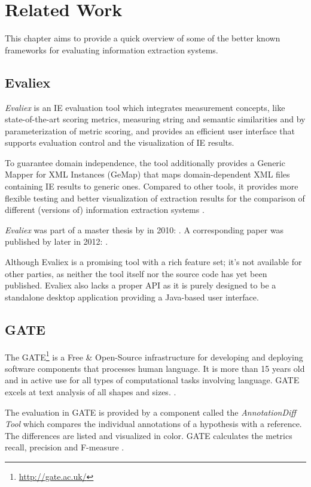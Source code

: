 \section{Related Work}
\label{sec:related-work}
This chapter aims to provide a quick overview of some of the better known frameworks for evaluating information extraction systems.

\subsection{Evaliex}
\textit{Evaliex} is an \gls{IE} evaluation tool which integrates measurement concepts, like state-of-the-art scoring metrics, measuring string and semantic similarities and by parameterization of metric scoring, and provides an efficient user interface that supports evaluation control and the visualization of \gls{IE} results.

To guarantee domain independence, the tool additionally provides a Generic Mapper for XML Instances (GeMap) that maps domain-dependent XML files containing \gls{IE} results to generic ones. Compared to other tools, it provides more flexible testing and better visualization of extraction results for the comparison of different (versions of) information extraction systems \cite{Feilmayr:2012}.

\textit{Evaliex}  was part of a master thesis by \citeauthor{Linsmayr:2010} in 2010:  \cite{Linsmayr:2010}. A corresponding paper was published by \citeauthor{Feilmayr:2012} later in 2012:  \cite{Feilmayr:2012}.

Although Evaliex is a promising tool with a rich feature set; it's not available for other parties, as neither the tool itself nor the source code has yet been published. Evaliex also lacks a proper \gls{API} as it is purely designed to be a standalone desktop application providing a Java-based user interface.

\subsection{GATE}
The \gls{GATE}\footnote{\url{http://gate.ac.uk/}} is a Free \& Open-Source infrastructure for developing and deploying software components that processes human language. It is more than 15 years old and in active use for all types of computational tasks involving language. GATE excels at text analysis of all shapes and sizes. \cite{Cunningham:2011}.

The evaluation in GATE is provided by a component called the \textit{AnnotationDiff Tool} which compares the individual annotations of a hypothesis with a reference. The differences are listed and visualized in color. GATE calculates the metrics recall, precision and F-measure \cite{Linsmayr:2010}.

